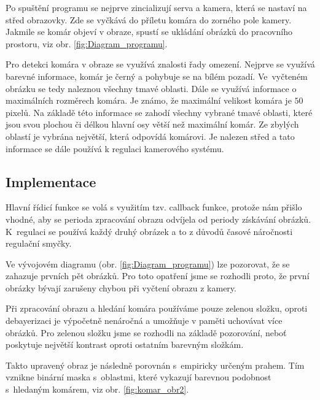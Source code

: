 \documentclass[a4paper,10pt]{article}
\begin{document}
		Po spuštění programu se nejprve zincializují serva a kamera, 
		která se nastaví na střed obrazovky.
		Zde se vyčkává do příletu komára do zorného pole kamery.
		Jakmile se komár objeví v obraze, spustí se ukládání obrázků do pracovního prostoru, viz obr. \ref{fig:Diagram_programu}.

		Pro detekci komára v obraze se využívá znalosti řady omezení. 
		Nejprve se využívá barevné informace, komár je černý a pohybuje se na bílém pozadí.
		Ve~vyčteném obrázku se tedy naleznou všechny tmavé oblasti. 
		Dále se využívá informace o maximálních rozměrech komára. 
		Je známo, že maximální velikost komára je $50$ pixelů. 
		Na základě této informace se zahodí všechny vybrané tmavé oblasti, 
		které jsou svou plochou či délkou hlavní osy větší než maximální komár.
		Ze zbylých oblastí je vybrána největší, která odpovídá komárovi.
		Je nalezen střed a tato informace se dále používá k regulaci kamerového systému.

\subsection{Implementace}

		Hlavní řídicí funkce se volá s využitím tzv. callback funkce, protože nám přišlo vhodné, 
		aby se perioda zpracování obrazu odvíjela od periody získávání obrázků.		
		K~regulaci se používá každý druhý obrázek a to z důvodů časové náročnosti regu\-lační smyčky.

		Ve vývojovém diagramu (obr. \ref{fig:Diagram_programu}) lze pozorovat, že se zahazuje prvních pět obrázků.
		Pro toto opatření jsme se rozhodli proto, 
		že první obrázky bývají zarušeny chybou při vyčtení obrazu z kamery.

		Při zpracování obrazu a hledání komára používáme pouze zelenou složku,
		oproti debayerizaci je výpočetně nenáročná a 
		umožňuje v paměti uchovávat více obrázků. Pro zelenou složku jsme se rozhodli na základě pozorování, 
		neboť poskytuje největší kontrast oproti ostatním barevným složkám.

		Takto upravený obraz je následně porovnán s~empiricky určeným prahem.
		Tím vznikne binární maska s~oblastmi, které vykazují barevnou podobnost s~hle\-da\-ným komárem, viz obr. \ref{fig:komar_obr2}.
\end{document}
